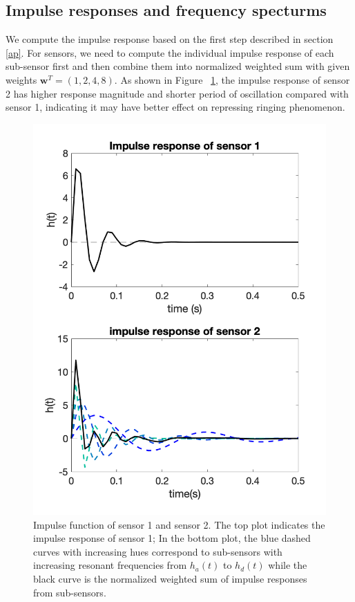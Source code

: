 \documentclass[12pt,a4paper,twocolumn]{article}
\begin{document}
\subsection{Impulse responses and frequency specturms}
We compute the impulse response based on the first step described in section \ref{ap}. For sensors, we need to compute the individual impulse response of each sub-sensor first and then combine them into normalized weighted sum with given weights $\mathbf{w}^T=(1,2,4,8)$.
As shown in Figure ~\ref{fig:3}, the impulse response of sensor 2 has higher response magnitude and shorter period of oscillation compared with sensor 1, indicating it may have better effect on repressing ringing phenomenon.
\begin{figure}[!ht]
    \centering
    \includegraphics[width=0.9\columnwidth]{lab2_impulse.png}
    \caption{Impulse function of sensor 1 and sensor 2. The top plot indicates the impulse response of sensor 1; In the bottom plot, the blue dashed curves with increasing hues correspond to sub-sensors with increasing resonant frequencies from $h_a(t)$ to $h_d(t)$ while the black curve is the normalized weighted sum of impulse responses from sub-sensors.}
    \label{fig:3}
\end{figure}
\end{document}
